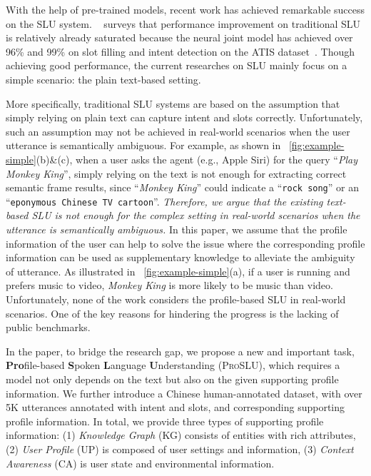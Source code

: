 \documentclass[letterpaper]{article} \usepackage{aaai22}  \usepackage{times}  \usepackage{helvet}  \usepackage{courier}  \usepackage[hyphens]{url}  \usepackage{graphicx} \urlstyle{rm} \def\UrlFont{\rm}  \usepackage{natbib}  \usepackage{caption} \DeclareCaptionStyle{ruled}{labelfont=normalfont,labelsep=colon,strut=off} \frenchspacing  \setlength{\pdfpagewidth}{8.5in}  \setlength{\pdfpageheight}{11in}  \usepackage{algorithm}
\begin{document}
With the help of pre-trained models, recent work has achieved remarkable success on the SLU system.
~\citet{ijcai2021-622} surveys that performance improvement on traditional SLU is relatively already saturated because the neural joint model has achieved over 96\% and 99\% on slot filling and intent detection on the ATIS dataset~\citep{hemphill-etal-1990-atis}.
Though achieving good performance, the current researches on SLU mainly focus on a simple scenario: the plain text-based setting.

More specifically, traditional SLU systems are based on the assumption that simply relying on plain text can capture intent and slots correctly.
Unfortunately, such an assumption may not be achieved in real-world scenarios when the user utterance is semantically ambiguous.
For example, as shown in \figurename~\ref{fig:example-simple}(b)\&(c), when a user asks the agent (e.g., Apple Siri) for the query ``\textit{Play {Monkey King}}'', simply relying on the text is not enough for extracting correct semantic frame results, since ``\textit{Monkey King}'' could indicate a ``\texttt{rock song}'' or an ``\texttt{eponymous Chinese TV cartoon}''. 
\textit{Therefore, we argue that the existing text-based SLU is not enough for the complex setting in real-world scenarios when the utterance is semantically ambiguous.}
In this paper, we assume that the profile information of the user can help to solve the issue where the corresponding profile information can be used as supplementary knowledge to alleviate the ambiguity of utterance.
As illustrated in \figurename~\ref{fig:example-simple}(a), if a user is running and prefers music to video, \textit{Monkey King} is more likely to be music than video.
Unfortunately, none of the work considers the profile-based SLU in real-world scenarios.
One of the key reasons for hindering the progress is the lacking of public benchmarks.

In the paper, to bridge the research gap, we propose a new and important task, \textbf{Pro}file-based \textbf{S}poken \textbf{L}anguage \textbf{U}nderstanding (\textsc{ProSLU}), which requires a model not only depends on the text but also on the given supporting profile information.
We further introduce a Chinese human-annotated dataset, with over 5K utterances annotated with intent and slots, and corresponding supporting profile information. 
In total, we provide three types of supporting profile information: 
(1) \textit{Knowledge Graph} (KG) consists of entities with rich attributes, 
(2) \textit{User Profile} (UP) is composed of user settings and information,
(3) \textit{Context Awareness} (CA) is user state and environmental information.
\end{document}
